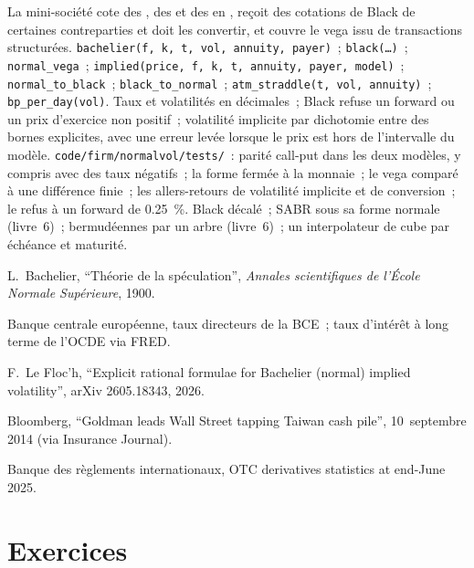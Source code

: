 \begin{build}
 La mini-société cote des , des  et des  en
, reçoit des cotations de Black de certaines contreparties et doit les
convertir, et couvre le vega issu de transactions structurées.
 \texttt{bachelier(f, k, t, vol, annuity, payer)}~;
\texttt{black(\ldots)}~; \texttt{normal\_vega}~; \texttt{implied(price, f, k, t,
annuity, payer, model)}~; \texttt{normal\_to\_black}~;
\texttt{black\_to\_normal}~; \texttt{atm\_straddle(t, vol, annuity)}~;
\texttt{bp\_per\_day(vol)}.
 Taux et volatilités en décimales~; Black refuse un forward ou un prix d'exercice
non positif~; volatilité implicite par dichotomie entre des bornes explicites,
avec une erreur levée lorsque le prix est hors de l'intervalle du modèle.
 \texttt{code/firm/normalvol/tests/}~: parité call-put dans
les deux modèles, y compris avec des taux négatifs~; la forme fermée à la monnaie~; le vega
comparé à une différence finie~; les allers-retours de volatilité implicite et de conversion~;
le refus à un forward de 0.25~\%.
 Black décalé~; SABR sous sa forme normale (livre~6)~;
 bermudéennes par un arbre (livre~6)~; un interpolateur de cube par
échéance et maturité.
\end{build}

\begin{omsources}
\item L.~Bachelier, ``Théorie de la spéculation'', \emph{Annales
scientifiques de l'École Normale Supérieure}, 1900.
\item Banque centrale européenne, taux directeurs de la BCE~; taux d'intérêt à long terme
de l'OCDE via FRED.
\item F.~Le Floc'h, ``Explicit rational formulae for Bachelier (normal) implied
volatility'', arXiv 2605.18343, 2026.
\item Bloomberg, ``Goldman leads Wall Street tapping Taiwan cash pile'',
10~septembre 2014 (via Insurance Journal).
\item Banque des règlements internationaux, OTC derivatives statistics at
end-June 2025.
\end{omsources}

\section{Exercices}

